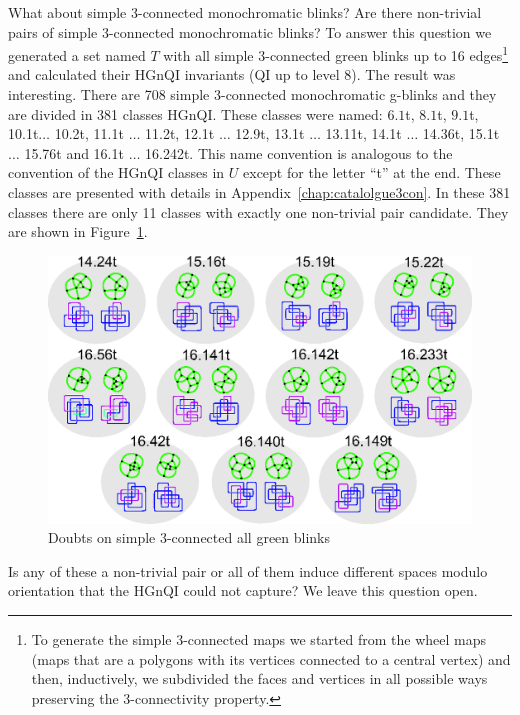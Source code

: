 What about simple 3-connected monochromatic blinks?  Are there
non-trivial pairs of simple 3-connected monochromatic blinks?
To answer this question we generated a set named $T$ with all simple
3-connected green blinks up to 16 edges\footnote{To generate the simple
3-connected maps we started from the wheel maps (maps that are a polygons
with its vertices connected to a central vertex) and then, inductively, we
subdivided the faces and vertices in all possible ways preserving the
3-connectivity property.}
and calculated their HGnQI invariants (QI up to level 8).
The result was interesting. There are
708 simple 3-connected monochromatic g-blinks and they are divided in 381
classes HGnQI. These classes were named: $6.1$t, $8.1$t, $9.1$t,
10.1t$\ldots$ 10.2t, 11.1t $\ldots$ 11.2t, 12.1t $\ldots$ 12.9t,
13.1t $\ldots$ 13.11t, 14.1t $\ldots$ 14.36t, 15.1t $\ldots$ 15.76t
and 16.1t $\ldots$ 16.242t. This name convention is analogous to
the convention of the HGnQI classes in $U$ except for the
letter ``t'' at the end. These classes are presented with details in
Appendix~\ref{chap:catalolgue3con}. In these 381 classes there are
only 11 classes with exactly one non-trivial pair candidate. They
are shown in Figure~\ref{fig:doubts3ConnectedIsolated}.

\enlargethispage{2cm}

\begin{figure}[htp]
   \begin{center}
      \leavevmode
      \includegraphics{A.figs/doubts3connectedisolated.eps}
   \end{center}
   \vspace{-0.7cm}
   \caption{ Doubts on simple 3-connected all green blinks}
   \label{fig:doubts3ConnectedIsolated}
\end{figure}

Is any of these a non-trivial pair or all of them induce different spaces
modulo orientation that the HGnQI could not capture? We leave this question
open.
